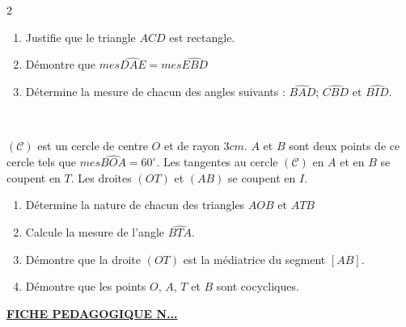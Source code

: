 \begin{multicols*}{2}
\begin{center}
  	\end{center}
  	\begin{enumerate}
  		\item Justifie que le triangle $ACD$ est rectangle.
  		\item Démontre que $mes\widehat{DAE}=mes\widehat{EBD}$ 
  		\item Détermine la mesure de chacun des angles suivants : $\widehat{BAD}$;  $\widehat{CBD}$ et  $\widehat{BID}$.
  	\end{enumerate}
  	
  	\begin{center}
  		\\
  	\end{center}
  	$\mathcal{(C)}$ est un cercle de centre $O$ et de rayon $3cm$. $A$ et $B$ sont deux points de ce cercle tels que $mes\widehat{BOA}=60^\circ$. Les tangentes au 
  	cercle $\mathcal{(C)}$ en $A$ et en $B$ se coupent en $T$. Les droites $(OT)$ et $(AB)$ se coupent en $I$.
  	\begin{enumerate}
  		\item Détermine la nature de chacun des triangles $AOB$ et $ATB$
  		\item  Calcule la mesure de l’angle $\widehat{BTA}$.
  		\item Démontre que la droite $(OT)$ est la médiatrice du segment $[AB]$.
  		\item  Démontre que les points $O$, $A$, $T$ et $B$ sont cocycliques. 
  	\end{enumerate}
  \end{multicols*}
     \newpage
   \begin{center}
   	\underline{\textbf{\Large FICHE PEDAGOGIQUE N...}}
   \end{center}
